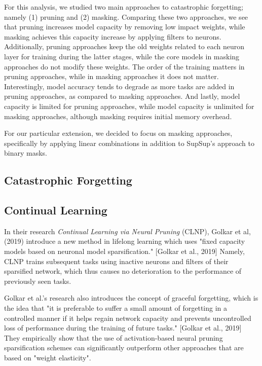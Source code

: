 \documentclass{article}
\begin{document}
For this analysis, we studied two main approaches to catastrophic forgetting; namely (1) pruning and (2) masking. Comparing these two approaches, we see that pruning increases model capacity by removing low impact weights, while masking achieves this capacity increase by applying filters to neurons. Additionally, pruning approaches keep the old weights related to each neuron layer for training during the latter stages, while the core models in masking approaches do not modify these weights. The order of the training matters in pruning approaches, while in masking approaches it does not matter. Interestingly, model accuracy tends to degrade as more tasks are added in pruning approaches, as compared to masking approaches. And lastly, model capacity is limited for pruning approaches, while model capacity is unlimited for masking approaches, although masking requires initial memory overhead.

For our particular extension, we decided to focus on masking approaches, specifically by applying linear combinations in addition to SupSup's approach to binary masks. 

\subsection{Catastrophic Forgetting}


\subsection{Continual Learning}
In their research \emph{Continual Learning via Neural Pruning} (CLNP), Golkar et al, (2019) introduce a new method in lifelong learning which uses "fixed capacity models based on neuronal model sparsification." [Golkar et al., 2019] Namely, CLNP trains subsequent tasks using inactive neurons and filters of their sparsified network, which thus causes no deterioration to the performance of previously seen tasks. 

Golkar et al.'s research also introduces the concept of graceful forgetting, which is the idea that "it is preferable to suffer a small amount of forgetting in a controlled manner if it helps regain network capacity and prevents uncontrolled loss of performance during the training of future tasks." [Golkar et al., 2019] They empirically show that the use of activation-based neural pruning sparsification schemes can significantly outperform other approaches that are based on "weight elasticity". 
\end{document}
